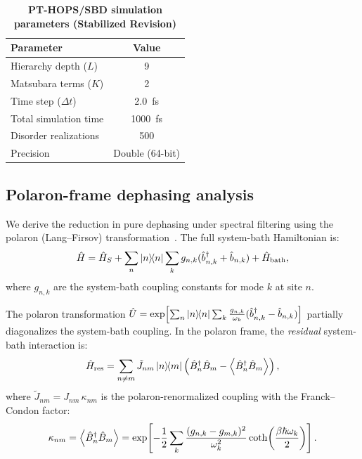 \documentclass[11pt,a4paper]{article}
\begin{document}
\begin{table}[h]
\centering
\caption{\textbf{PT-HOPS/SBD simulation parameters (Stabilized Revision)}}
\label{tab:SI_parameters}
\begin{tabular}{lc}
\toprule
\textbf{Parameter} & \textbf{Value} \\
\midrule
Hierarchy depth ($L$) & 9 \\
Matsubara terms ($K$) & 2 \\
Time step ($\Delta t$) & \SI{2.0}{\femto\second} \\
Total simulation time & \SI{1000}{\femto\second} \\
Disorder realizations & 500 \\
Precision & Double (64-bit) \\
\bottomrule
\end{tabular}
\end{table}

\subsection{Polaron-frame dephasing analysis}
\label{sec:polaron_dephasing}

We derive the reduction in pure dephasing under spectral filtering using the polaron (Lang--Firsov) transformation~\cite{Huelga2013,Chin2011}. The full system-bath Hamiltonian is:
\begin{equation}
\hat{H} = \hat{H}_S + \sum_n \dyad{n} \sum_k g_{n,k}(\hat{b}_{n,k}^\dagger + \hat{b}_{n,k}) + \hat{H}_{\mathrm{bath}},
\label{eq:SI_full_hamiltonian}
\end{equation}
where $g_{n,k}$ are the system-bath coupling constants for mode $k$ at site $n$.

The polaron transformation $\hat{U} = \exp\!\left[\sum_n \dyad{n} \sum_k \frac{g_{n,k}}{\omega_k}(\hat{b}_{n,k}^\dagger - \hat{b}_{n,k})\right]$ partially diagonalizes the system-bath coupling. In the polaron frame, the \textit{residual} system-bath interaction is:
\begin{equation}
\hat{H}_{\mathrm{res}} = \sum_{n \neq m} \tilde{J}_{nm} \dyad{n}{m} \left(\hat{B}_n^\dagger \hat{B}_m - \expval{\hat{B}_n^\dagger \hat{B}_m}\right),
\label{eq:SI_residual}
\end{equation}
where $\tilde{J}_{nm} = J_{nm}\, \kappa_{nm}$ is the polaron-renormalized coupling with the Franck--Condon factor:
\begin{equation}
\kappa_{nm} = \expval{\hat{B}_n^\dagger \hat{B}_m} = \exp\!\left[-\frac{1}{2}\sum_k \frac{(g_{n,k} - g_{m,k})^2}{\omega_k^2} \coth\!\left(\frac{\beta\hbar\omega_k}{2}\right)\right].
\label{eq:SI_FC_factor}
\end{equation}
\end{document}
